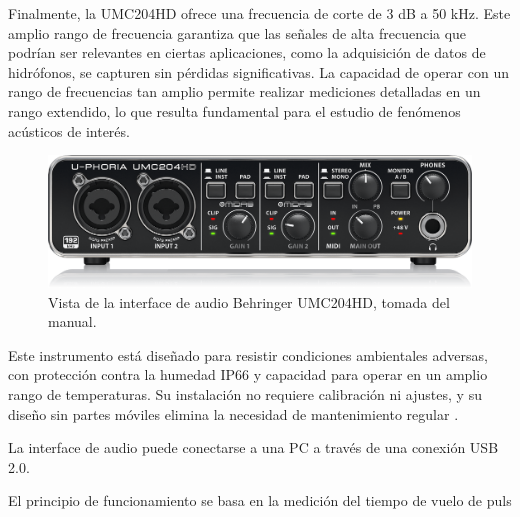 Finalmente, la UMC204HD ofrece una frecuencia de corte de 3 dB a 50 kHz. Este amplio rango de frecuencia garantiza que las señales de alta frecuencia que podrían ser relevantes en ciertas aplicaciones, como la adquisición de datos de hidrófonos, se capturen sin pérdidas significativas. La capacidad de operar con un rango de frecuencias tan amplio permite realizar mediciones detalladas en un rango extendido, lo que resulta fundamental para el estudio de fenómenos acústicos de interés.


\vspace{10px}
\begin{figure}[ht]
    \centering
    \includegraphics[width=.5\textwidth]{graficos/UMC204HD.png}
    \caption[]{Vista de la interface de audio Behringer UMC204HD, tomada del manual.}
    \label{fig:placa}
\end{figure}

Este instrumento está diseñado para resistir condiciones ambientales adversas, con protección contra la humedad IP66 \citep{IEC60529} y capacidad para operar en un amplio rango de temperaturas. Su instalación no requiere calibración ni ajustes, y su diseño sin partes móviles elimina la necesidad de mantenimiento regular \citep{WindSonicManual2019}. 

La interface de audio puede conectarse a una PC a través de una conexión USB 2.0.

El principio de funcionamiento se basa en la medición del tiempo de vuelo de puls

\clearpage

\relaxFloats

%